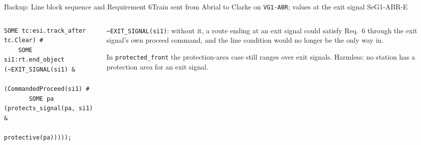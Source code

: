 \documentclass[aspectratio=169,10pt]{beamer}
\newcommand{\tinyfont}{\fontsize{6.2}{7.5}\selectfont}
\begin{document}
\begin{frame}[fragile]{Backup: Line block sequence and Requirement 6}{Train sent from Abrial to Clarke on \texttt{VG1-ABR}; values at the exit signal SeG1-ABR-E}
\begin{columns}[T]
\begin{column}{0.52\textwidth}
\begin{codebox}[top=0.5mm,bottom=0.5mm]
\begin{lstlisting}[basicstyle=\fontsize{5.8}{6.7}\ttfamily]
      SOME tc:esi.track_after tc.Clear) #
    SOME si1:rt.end_object (~EXIT_SIGNAL(si1) &
      (CommandedProceed(si1) #
       SOME pa (protects_signal(pa, si1) &
                protective(pa)))));
\end{lstlisting}
      \end{codebox}
    \end{column}
    \begin{column}{0.46\textwidth}
      {\tinyfont\color{DarkText} \texttt{\textasciitilde EXIT\_SIGNAL(si1)}: without it, a route ending at an exit signal could satisfy Req.~6 through the exit signal's own proceed command, and the line condition would no longer be the only way in.\par
      \vspace{0.8mm}
      In \texttt{protected\_front} the protection-area case still ranges over exit signals. Harmless: no station has a protection area for an exit signal.\par}
    \end{column}
  \end{columns}
\end{frame}
\end{document}
